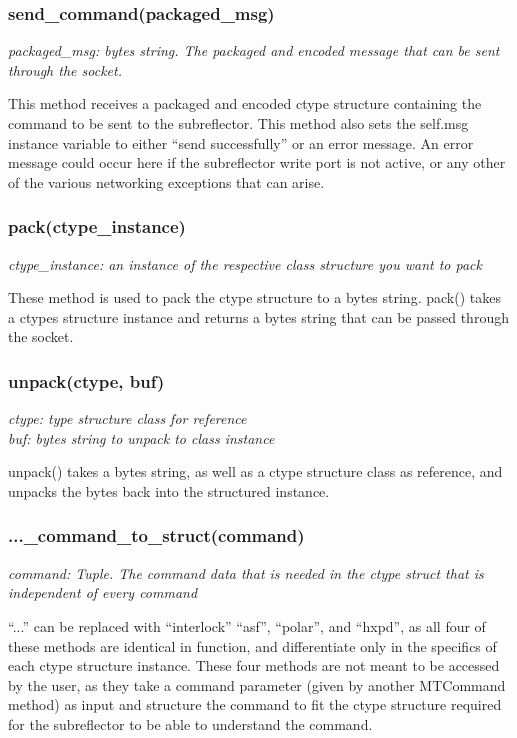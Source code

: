 \documentclass{article}
\begin{document}
\subsubsection{send\_command(packaged\_msg)}
\emph{packaged\_msg: bytes string. The packaged and encoded message that can be sent through the socket.} 
\vspace{10pt}

This method receives a packaged and encoded ctype structure containing the command to be sent to the subreflector. This method also sets the self.msg instance variable to either ``send successfully'' or an error message. An error message could occur here if the subreflector write port is not active, or any other of the various networking exceptions that can arise. 


\subsubsection{pack(ctype\_instance)}
\emph{ctype\_instance: an instance of the respective class structure you want to pack}
\vspace{10pt}

These method is used to pack the ctype structure to a bytes string. pack() takes a ctypes structure instance and  returns a bytes string that can be passed through the socket. 


\subsubsection{unpack(ctype, buf)}
\emph{ctype: type structure class for reference}\\
\emph{buf: bytes string to unpack to class instance}
\vspace{10pt}

unpack() takes a bytes string, as well as a ctype structure class as reference, and unpacks the bytes back into the structured instance.

\subsubsection{...\_command\_to\_struct(command)}
\emph{command: Tuple. The command data that is needed in the ctype struct that is independent of every command}
\vspace{10pt}

``...'' can be replaced with ``interlock'' ``asf'', ``polar'', and ``hxpd'', as all four of these methods are identical in function, and differentiate only in the specifics of each ctype structure instance. These four methods are not meant to be accessed by the user, as they take a command parameter (given by another MTCommand method) as input and structure the command to fit the ctype structure required for the subreflector to be able to understand the command.
\vspace{10pt}
\end{document}
